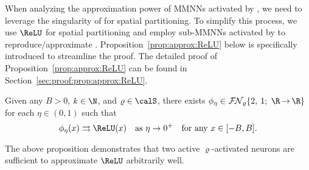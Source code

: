 \documentclass[11pt,a4paper]{article}
\begin{document}
When analyzing the approximation power of MMNNs activated by , we need to leverage the singularity of    for spatial partitioning. To simplify this process, we use \(\ReLU\) for spatial partitioning and employ sub-MMNNs activated by    to reproduce/approximate  \ReLU. Proposition~\ref{prop:approx:ReLU} below is specifically introduced to streamline the proof. The detailed proof of Proposition~\ref{prop:approx:ReLU} can be found in Section~\ref{sec:proof:prop:approx:ReLU}.


\begin{proposition}
	\label{prop:approx:ReLU}
	Given any $B>0$, $k\in \N$, and $\varrho\in \calS$, there exists
	$\phi_\eta\in \nn{\varrho}{2}{1}{\R}{\R}$ for each $\eta\in (0,1)$
	such that
	\begin{equation*}
		\phi_\eta(x)\rightrightarrows \ReLU(x)\quad \tn{as}\   \eta\to 0^+ \quad \tn{for any $x\in [-B,B]$.}
	\end{equation*}
\end{proposition}

The above proposition demonstrates that two active \(\varrho\)-activated neurons are sufficient to approximate \(\ReLU\) arbitrarily well.





\end{document}
